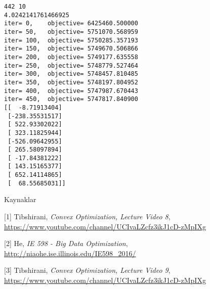 \documentclass[12pt,fleqn]{article}\usepackage{../../common}
\begin{document}
\begin{verbatim}
442 10
4.0242141761466925
iter= 0,	objective= 6425460.500000
iter= 50,	objective= 5751070.568959
iter= 100,	objective= 5750285.357193
iter= 150,	objective= 5749670.506866
iter= 200,	objective= 5749177.635558
iter= 250,	objective= 5748779.527464
iter= 300,	objective= 5748457.810485
iter= 350,	objective= 5748197.804952
iter= 400,	objective= 5747987.670443
iter= 450,	objective= 5747817.840900
[[  -8.71913404]
 [-238.35531517]
 [ 522.93302022]
 [ 323.11825944]
 [-526.09642955]
 [ 265.58097894]
 [ -17.84381222]
 [ 143.15165377]
 [ 652.14114865]
 [  68.55685031]]
\end{verbatim}

Kaynaklar

[1] Tibshirani, {\em Convex Optimization, Lecture Video 8}, 
\url{https://www.youtube.com/channel/UCIvaLZcfz3ikJ1cD-zMpIXg}

[2] He, {\em IE 598 - Big Data Optimization},  
    \url{http://niaohe.ise.illinois.edu/IE598_2016/}

[3] Tibshirani, {\em Convex Optimization, Lecture Video 9}, 
\url{https://www.youtube.com/channel/UCIvaLZcfz3ikJ1cD-zMpIXg}
\end{document}
